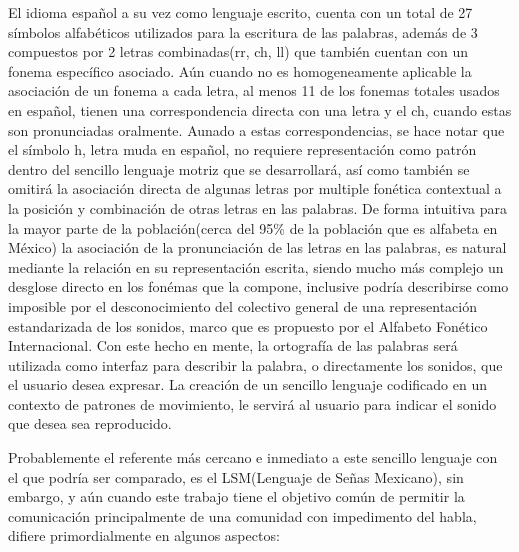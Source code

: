 \hfill\break
\hfill\break
\justifying
El idioma español a su vez como lenguaje escrito, cuenta con un total de 27 símbolos alfabéticos utilizados para la escritura de las palabras, además de 3 compuestos por 2 letras combinadas(rr, ch, ll) que también cuentan con un fonema específico asociado. Aún cuando no es homogeneamente aplicable la asociación de un fonema a cada letra, al menos 11 de los fonemas totales usados en español, tienen una correspondencia directa con una letra y el ch, cuando estas son pronunciadas oralmente.
\hfill\break
\justifying
Aunado a estas correspondencias, se hace notar que el símbolo h, letra muda en español, no requiere representación como patrón dentro del sencillo lenguaje motriz que se desarrollará, así como también se omitirá la asociación directa de algunas letras por multiple fonética contextual a la posición y combinación de otras letras en las palabras.
\hfill\break
\hfill\break
\justifying
De forma intuitiva para la mayor parte de la población(cerca del 95\% de la población que es alfabeta en México) la asociación de la pronunciación de las letras en las palabras, es natural mediante la relación en su representación escrita, siendo mucho más complejo un desglose directo en los fonémas que la compone, inclusive podría describirse como imposible por el desconocimiento del colectivo general de una representación estandarizada de los sonidos, marco que es propuesto por el Alfabeto Fonético Internacional.
\hfill\break
\justifying
Con este hecho en mente, la ortografía de las palabras será utilizada como interfaz para describir la palabra, o directamente los sonidos, que el usuario desea expresar.
\hfill\break
\justifying
La creación de un sencillo lenguaje codificado en un contexto de patrones de movimiento, le servirá al usuario para indicar el sonido que desea sea reproducido.

\hfill\break
\justifying
Probablemente el referente más cercano e inmediato a este sencillo lenguaje con el que podría ser comparado, es el LSM(Lenguaje de Señas Mexicano), sin embargo, y aún cuando este trabajo tiene el objetivo común de permitir la comunicación principalmente de una comunidad con impedimento del habla, difiere primordialmente en algunos aspectos: 

